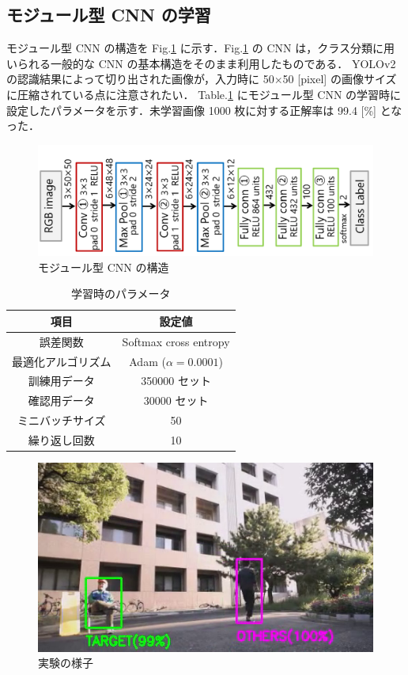 \documentclass[twocolumn,10pt]{jarticle}
\begin{document}
\subsection{モジュール型 CNN の学習}
モジュール型 CNN の構造を Fig.\ref{fig:module_cnn} に示す．Fig.\ref{fig:module_cnn} の CNN は，クラス分類に用いられる一般的な CNN の基本構造をそのまま利用したものである．
YOLOv2 の認識結果によって切り出された画像が，入力時に 50$\times$50 [pixel] の画像サイズに圧縮されている点に注意されたい．
Table.\ref{tb:params} にモジュール型 CNN の学習時に設定したパラメータを示す．未学習画像 1000 枚に対する正解率は 99.4 [\%] となった．
\begin{figure}[t]
\centering
 \includegraphics[scale=0.31]{fig/module_cnn.png}
 \caption{モジュール型 CNN の構造}
 \label{fig:module_cnn}
\end{figure}
\begin{table}[b]
 \begin{center}
  \caption{学習時のパラメータ}
  \begin{tabular}{|c|c|} \hline
   項目 & 設定値 \\ \hline \hline
   誤差関数 & Softmax cross entropy \\ \hline
   最適化アルゴリズム & Adam ($\alpha = 0.0001$) \\ \hline
   訓練用データ & 350000 セット\\ \hline
   確認用データ & 30000 セット \\ \hline
   ミニバッチサイズ & 50 \\ \hline
   繰り返し回数 & 10 \\ \hline
  \end{tabular}
  \label{tb:params}
 \end{center}
\end{table}
\begin{figure}[t]
\centering
 \includegraphics[scale=0.45]{fig/exp.png}
 \caption{実験の様子}
 \label{fig:exp}
\end{figure}
\end{document}
